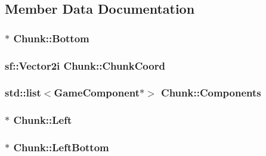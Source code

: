 \subsection{Member Data Documentation}
\hypertarget{class_chunk_ac9ac53a727ae045b6f751ec6a68bcaca}{
\subsubsection[{Bottom}]{$\ast$ Chunk\-::\-Bottom\hspace{0.3cm}{\ttfamily [protected]}}}\label{class_chunk_ac9ac53a727ae045b6f751ec6a68bcaca}
\hypertarget{class_chunk_abb5b1842148b3d7c616065766bfd2b33}{
\subsubsection[{Chunk\-Coord}]{\setlength{\rightskip}{0pt plus 5cm}sf\-::\-Vector2i Chunk\-::\-Chunk\-Coord\hspace{0.3cm}{\ttfamily [protected]}}}\label{class_chunk_abb5b1842148b3d7c616065766bfd2b33}
\hypertarget{class_chunk_a4cdf6febd96ff99b681e37d548617a38}{
\subsubsection[{Components}]{\setlength{\rightskip}{0pt plus 5cm}std\-::list$<${\bf Game\-Component}$\ast$$>$ Chunk\-::\-Components\hspace{0.3cm}{\ttfamily [protected]}}}\label{class_chunk_a4cdf6febd96ff99b681e37d548617a38}
\hypertarget{class_chunk_aee27c2584364a58dc8811e9ada0695dd}{
\subsubsection[{Left}]{$\ast$ Chunk\-::\-Left\hspace{0.3cm}{\ttfamily [protected]}}}\label{class_chunk_aee27c2584364a58dc8811e9ada0695dd}
\hypertarget{class_chunk_af3577f37139ffeb74181d9ce3c48f5e6}{
\subsubsection[{Left\-Bottom}]{$\ast$ Chunk\-::\-Left\-Bottom\hspace{0.3cm}{\ttfamily [protected]}}}\label{class_chunk_af3577f37139ffeb74181d9ce3c48f5e6}
